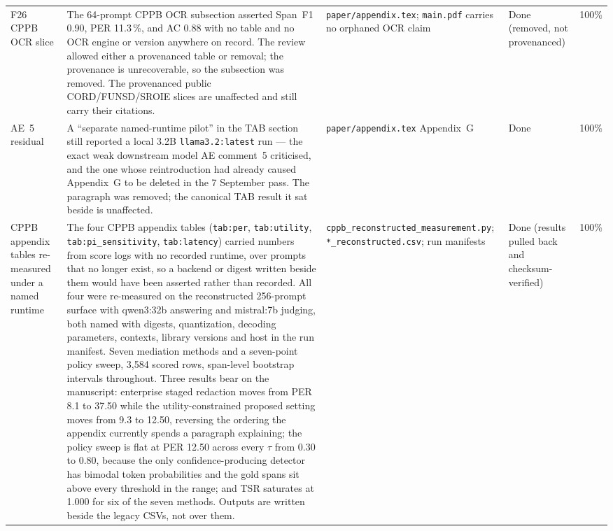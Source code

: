 \documentclass[11pt]{article}
\begin{document}
\begin{longtable}{p{}p{}p{}p{}p{}}
F26 CPPB OCR slice & The 64-prompt CPPB OCR subsection asserted Span~F1 0.90, PER 11.3\,\%, and AC 0.88 with no table and no OCR engine or version anywhere on record. The review allowed either a provenanced table or removal; the provenance is unrecoverable, so the subsection was removed. The provenanced public CORD/FUNSD/SROIE slices are unaffected and still carry their citations. & \texttt{paper/appendix.tex}; \texttt{main.pdf} carries no orphaned OCR claim & Done (removed, not provenanced) & 100\% \\
AE~5 residual & A ``separate named-runtime pilot'' in the TAB section still reported a local 3.2B \texttt{llama3.2:latest} run --- the exact weak downstream model AE comment~5 criticised, and the one whose reintroduction had already caused Appendix~G to be deleted in the 7 September pass. The paragraph was removed; the canonical TAB result it sat beside is unaffected. & \texttt{paper/appendix.tex} Appendix~G & Done & 100\% \\
CPPB appendix tables re-measured under a named runtime & The four CPPB appendix tables (\texttt{tab:per}, \texttt{tab:utility}, \texttt{tab:pi\_sensitivity}, \texttt{tab:latency}) carried numbers from score logs with no recorded runtime, over prompts that no longer exist, so a backend or digest written beside them would have been asserted rather than recorded. All four were re-measured on the reconstructed 256-prompt surface with qwen3:32b answering and mistral:7b judging, both named with digests, quantization, decoding parameters, contexts, library versions and host in the run manifest. Seven mediation methods and a seven-point policy sweep, 3{,}584 scored rows, span-level bootstrap intervals throughout. Three results bear on the manuscript: enterprise staged redaction moves from PER 8.1 to 37.50 while the utility-constrained proposed setting moves from 9.3 to 12.50, reversing the ordering the appendix currently spends a paragraph explaining; the policy sweep is flat at PER 12.50 across every $\tau$ from 0.30 to 0.80, because the only confidence-producing detector has bimodal token probabilities and the gold spans sit above every threshold in the range; and TSR saturates at 1.000 for six of the seven methods. Outputs are written beside the legacy CSVs, not over them. & \texttt{cppb\_reconstructed\_measurement.py}; \texttt{*\_reconstructed.csv}; run manifests & Done (results pulled back and checksum-verified) & 100\% \\

\end{longtable}
\end{document}
